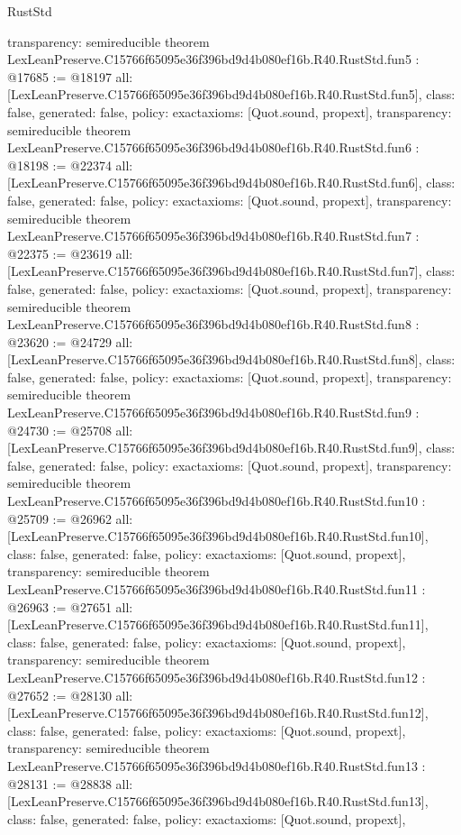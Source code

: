 \begin{lexlean}{RustStd}
\begin{coremodule}
{  transparency: semireducible
}
theorem LexLeanPreserve.C15766f65095e36f396bd9d4b080ef16b.R40.RustStd.fun5 : @17685 := @18197 {
  all: [LexLeanPreserve.C15766f65095e36f396bd9d4b080ef16b.R40.RustStd.fun5],
  class: false,
  generated: false,
  policy: exact{axioms: [Quot.sound, propext]},
  transparency: semireducible
}
theorem LexLeanPreserve.C15766f65095e36f396bd9d4b080ef16b.R40.RustStd.fun6 : @18198 := @22374 {
  all: [LexLeanPreserve.C15766f65095e36f396bd9d4b080ef16b.R40.RustStd.fun6],
  class: false,
  generated: false,
  policy: exact{axioms: [Quot.sound, propext]},
  transparency: semireducible
}
theorem LexLeanPreserve.C15766f65095e36f396bd9d4b080ef16b.R40.RustStd.fun7 : @22375 := @23619 {
  all: [LexLeanPreserve.C15766f65095e36f396bd9d4b080ef16b.R40.RustStd.fun7],
  class: false,
  generated: false,
  policy: exact{axioms: [Quot.sound, propext]},
  transparency: semireducible
}
theorem LexLeanPreserve.C15766f65095e36f396bd9d4b080ef16b.R40.RustStd.fun8 : @23620 := @24729 {
  all: [LexLeanPreserve.C15766f65095e36f396bd9d4b080ef16b.R40.RustStd.fun8],
  class: false,
  generated: false,
  policy: exact{axioms: [Quot.sound, propext]},
  transparency: semireducible
}
theorem LexLeanPreserve.C15766f65095e36f396bd9d4b080ef16b.R40.RustStd.fun9 : @24730 := @25708 {
  all: [LexLeanPreserve.C15766f65095e36f396bd9d4b080ef16b.R40.RustStd.fun9],
  class: false,
  generated: false,
  policy: exact{axioms: [Quot.sound, propext]},
  transparency: semireducible
}
theorem LexLeanPreserve.C15766f65095e36f396bd9d4b080ef16b.R40.RustStd.fun10 : @25709 := @26962 {
  all: [LexLeanPreserve.C15766f65095e36f396bd9d4b080ef16b.R40.RustStd.fun10],
  class: false,
  generated: false,
  policy: exact{axioms: [Quot.sound, propext]},
  transparency: semireducible
}
theorem LexLeanPreserve.C15766f65095e36f396bd9d4b080ef16b.R40.RustStd.fun11 : @26963 := @27651 {
  all: [LexLeanPreserve.C15766f65095e36f396bd9d4b080ef16b.R40.RustStd.fun11],
  class: false,
  generated: false,
  policy: exact{axioms: [Quot.sound, propext]},
  transparency: semireducible
}
theorem LexLeanPreserve.C15766f65095e36f396bd9d4b080ef16b.R40.RustStd.fun12 : @27652 := @28130 {
  all: [LexLeanPreserve.C15766f65095e36f396bd9d4b080ef16b.R40.RustStd.fun12],
  class: false,
  generated: false,
  policy: exact{axioms: [Quot.sound, propext]},
  transparency: semireducible
}
theorem LexLeanPreserve.C15766f65095e36f396bd9d4b080ef16b.R40.RustStd.fun13 : @28131 := @28838 {
  all: [LexLeanPreserve.C15766f65095e36f396bd9d4b080ef16b.R40.RustStd.fun13],
  class: false,
  generated: false,
  policy: exact{axioms: [Quot.sound, propext]},
}
\end{coremodule}
\end{lexlean}
